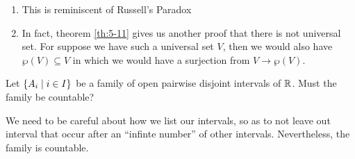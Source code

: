 \documentclass{article}
\begin{document}
\begin{remark}\leavevmode
    \begin{enumerate}[label=(\arabic*)]
        \item This is reminiscent of Russell's Paradox
        \item In fact, theorem \ref{th:5-11} gives us another proof that there is not universal set.
        For suppose we have such a universal set $V$, then we would also have $\wp(V) \subseteq V$ in which we would have a surjection from $V \rightarrow \wp(V)$.
    \end{enumerate}
\end{remark}

\begin{eg}
    Let $\left\{ A_i \mid i \in I \right\}$ be a family of open pairwise disjoint intervals of $\mathbb{R}$.
    Must the family be countable?
\end{eg}
\begin{warning}
    We need to be careful about how we list our intervals, so as to not leave out interval that occur after an ``infinte number'' of other intervals.
    Nevertheless, the family is countable.
\end{warning}
\end{document}
